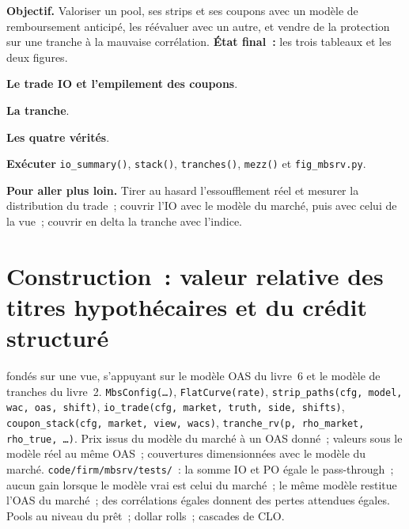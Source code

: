 \begin{tutorial}
\textbf{Objectif.} Valoriser un pool, ses strips et ses coupons avec un modèle de remboursement anticipé, les réévaluer avec un autre, et vendre de la protection sur une tranche à la
mauvaise corrélation. \textbf{État final~:} les trois tableaux et les deux figures.
\begin{tutsteps}
\item \textbf{Le trade IO et l'empilement des coupons}.
\label{lst:s2:mortgage-and-structured-credit-strategies:io}
\item \textbf{La tranche}.
\label{lst:s2:mortgage-and-structured-credit-strategies:tranche}
\item \textbf{Les quatre vérités}.
\label{lst:s2:mortgage-and-structured-credit-strategies:truths}
\item \textbf{Exécuter} \texttt{io\_summary()}, \texttt{stack()}, \texttt{tranches()}, \texttt{mezz()} et \texttt{fig\_mbsrv.py}.
\end{tutsteps}
\textbf{Pour aller plus loin.} Tirer au hasard l'essoufflement réel et mesurer la distribution du trade~; couvrir l'IO avec le modèle du marché, puis
avec celui de la vue~; couvrir en delta la tranche avec l'indice.
\end{tutorial}

\section{Construction~: valeur relative des titres hypothécaires et du crédit structuré}\label{bld:s2:mortgage-and-structured-credit-strategies:mbsrv}

\begin{build}
  fondés sur une vue, s'appuyant sur le modèle OAS du livre~6 et le modèle de tranches du livre~2.
 \texttt{MbsConfig(\dots)}, \texttt{FlatCurve(rate)}, \texttt{strip\_paths(cfg, model, wac, oas, shift)},
\texttt{io\_trade(cfg, market, truth, side, shifts)}, \texttt{coupon\_stack(cfg, market, view, wacs)},
\texttt{tranche\_rv(p, rho\_market, rho\_true, \dots)}.
 Prix issus du modèle du marché à un OAS donné~; valeurs sous le modèle réel au même OAS~; couvertures dimensionnées avec le modèle du marché.
 \texttt{code/firm/mbsrv/tests/}~: la somme IO et PO égale le pass-through~; aucun gain lorsque le modèle vrai est celui du marché~; le même
modèle restitue l'OAS du marché~; des corrélations égales donnent des pertes attendues égales.
 Pools au niveau du prêt~; dollar rolls~; cascades de CLO.
\end{build}

